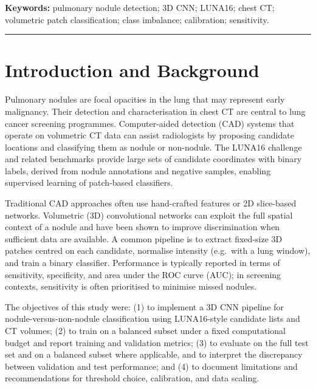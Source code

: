 \documentclass[11pt,a4paper]{article}
\begin{document}
\vspace{0.5em}
\noindent\textbf{Keywords:} pulmonary nodule detection; 3D CNN; LUNA16; chest CT; volumetric patch classification; class imbalance; calibration; sensitivity.

\vspace{1em}
\begin{center}
\rule{0.9\textwidth}{0.4pt}
\end{center}

\section{Introduction and Background}

Pulmonary nodules are focal opacities in the lung that may represent early malignancy. Their detection and characterisation in chest CT are central to lung cancer screening programmes. Computer-aided detection (CAD) systems that operate on volumetric CT data can assist radiologists by proposing candidate locations and classifying them as nodule or non-nodule. The LUNA16 challenge and related benchmarks provide large sets of candidate coordinates with binary labels, derived from nodule annotations and negative samples, enabling supervised learning of patch-based classifiers.

Traditional CAD approaches often use hand-crafted features or 2D slice-based networks. Volumetric (3D) convolutional networks can exploit the full spatial context of a nodule and have been shown to improve discrimination when sufficient data are available. A common pipeline is to extract fixed-size 3D patches centred on each candidate, normalise intensity (e.g.\ with a lung window), and train a binary classifier. Performance is typically reported in terms of sensitivity, specificity, and area under the ROC curve (AUC); in screening contexts, sensitivity is often prioritised to minimise missed nodules.

The objectives of this study were: (1) to implement a 3D CNN pipeline for nodule-versus-non-nodule classification using LUNA16-style candidate lists and CT volumes; (2) to train on a balanced subset under a fixed computational budget and report training and validation metrics; (3) to evaluate on the full test set and on a balanced subset where applicable, and to interpret the discrepancy between validation and test performance; and (4) to document limitations and recommendations for threshold choice, calibration, and data scaling.
\end{document}
